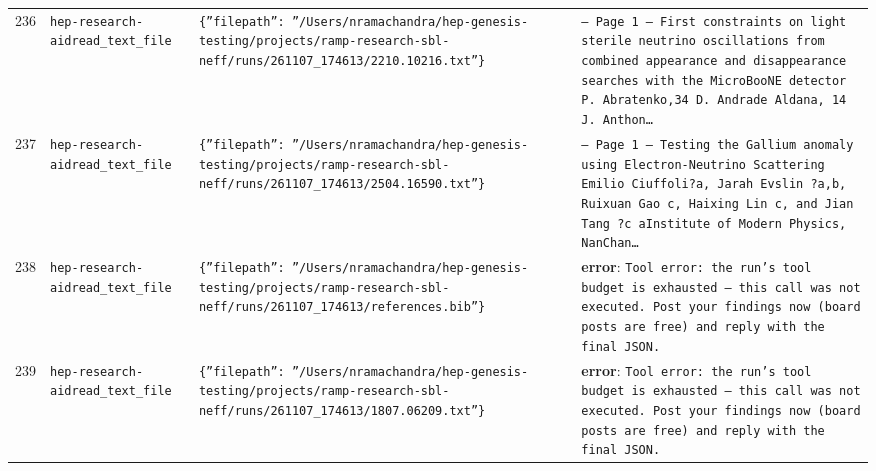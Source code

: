 \documentclass[11pt,a4paper]{article}
\begin{document}
\begin{longtable}{@{}p{}p{}p{}p{}@{}}
236 & \texttt{hep-research-aid}\newline\texttt{read\_\allowbreak{}text\_\allowbreak{}file} & \texttt{\{''filepath'':\allowbreak{} ''/\allowbreak{}Users/\allowbreak{}nramachandra/\allowbreak{}hep-genesis-testing/\allowbreak{}projects/\allowbreak{}ramp-research-sbl-neff/\allowbreak{}runs/\allowbreak{}261107\_\allowbreak{}174613/\allowbreak{}2210.10216.txt''\}\allowbreak{}} & \texttt{--- Page 1 --- First constraints on light sterile neutrino oscillations from combined appearance and disappearance searches with the MicroBooNE detector P. Abratenko,\allowbreak{}34 D. Andrade Aldana,\allowbreak{} 14 J. Anthon\ldots{}\allowbreak{}} \\
237 & \texttt{hep-research-aid}\newline\texttt{read\_\allowbreak{}text\_\allowbreak{}file} & \texttt{\{''filepath'':\allowbreak{} ''/\allowbreak{}Users/\allowbreak{}nramachandra/\allowbreak{}hep-genesis-testing/\allowbreak{}projects/\allowbreak{}ramp-research-sbl-neff/\allowbreak{}runs/\allowbreak{}261107\_\allowbreak{}174613/\allowbreak{}2504.16590.txt''\}\allowbreak{}} & \texttt{--- Page 1 --- Testing the Gallium anomaly using Electron-Neutrino Scattering Emilio Ciuffoli?a,\allowbreak{} Jarah Evslin ?a,\allowbreak{}b,\allowbreak{} Ruixuan Gao c,\allowbreak{} Haixing Lin c,\allowbreak{} and Jian Tang ?c aInstitute of Modern Physics,\allowbreak{} NanChan\ldots{}\allowbreak{}} \\
238 & \texttt{hep-research-aid}\newline\texttt{read\_\allowbreak{}text\_\allowbreak{}file} & \texttt{\{''filepath'':\allowbreak{} ''/\allowbreak{}Users/\allowbreak{}nramachandra/\allowbreak{}hep-genesis-testing/\allowbreak{}projects/\allowbreak{}ramp-research-sbl-neff/\allowbreak{}runs/\allowbreak{}261107\_\allowbreak{}174613/\allowbreak{}references.bib''\}\allowbreak{}} & \textbf{error}: \texttt{Tool error:\allowbreak{} the run's tool budget is exhausted --- this call was not executed. Post your findings now (board posts are free)\allowbreak{} and reply with the final JSON.} \\
239 & \texttt{hep-research-aid}\newline\texttt{read\_\allowbreak{}text\_\allowbreak{}file} & \texttt{\{''filepath'':\allowbreak{} ''/\allowbreak{}Users/\allowbreak{}nramachandra/\allowbreak{}hep-genesis-testing/\allowbreak{}projects/\allowbreak{}ramp-research-sbl-neff/\allowbreak{}runs/\allowbreak{}261107\_\allowbreak{}174613/\allowbreak{}1807.06209.txt''\}\allowbreak{}} & \textbf{error}: \texttt{Tool error:\allowbreak{} the run's tool budget is exhausted --- this call was not executed. Post your findings now (board posts are free)\allowbreak{} and reply with the final JSON.} \\

\end{longtable}
\end{document}
